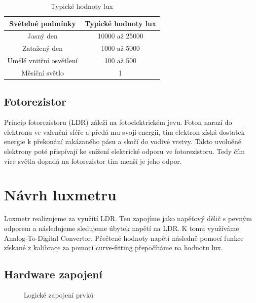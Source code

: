 \documentclass[a4paper,10pt,titlepage]{article}
\begin{document}
\begin{table}[h]
 \centering
 \begin{tabular}{c | c}
  Světelné podmínky & Typické hodnoty lux \\ \hline \hline
  Jasný den & 10000 až 25000 \\ \hline
  Zatažený den & 1000 až 5000 \\ \hline
  Umělé vnitřní osvětlení & 100 až 500 \\ \hline
  Měsíční světlo & 1
 \end{tabular}
  \caption{Typické hodnoty lux}
  \label{tab:lux_typical}
\end{table}

\subsection{Fotorezistor}
Princip fotorezistoru (LDR) záleží na fotoelektrickém jevu. Foton narazí do elektronu ve valenční sféře a předá mu svoji energii, tím elektron získá dostatek energie k překonání zakázaného pásu a skočí do vodivé vrstvy. Takto uvolněné elektrony poté přispívají ke snížení elektrické odporu ve fotorezistoru. Tedy čím více světla dopadá na fotorezistor tím menší je jeho odpor.

\section{Návrh luxmetru}
Luxmetr realizujeme za využití LDR. Ten zapojíme jako napěťový dělič s pevným odporem a následujeme sledujeme úbytek napětí na LDR. K tomu využíváme Analog-To-Digital Convertor. Přečtené hodnoty napětí následně pomocí funkce získané z kalibrace za pomocí curve-fitting přepočítáme na hodnotu lux.

\subsection{Hardware zapojení}
\begin{figure}[h]
\centering
{}%
\caption{Logické zapojení prvků}
\label{fig:my_label}
\end{figure}
\end{document}
